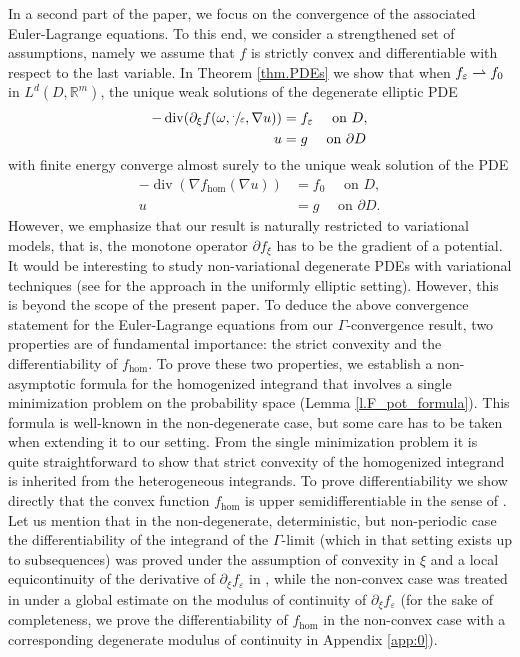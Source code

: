 \documentclass[JEP,XML,SOM,Unicode,published]{cedram}
\def\harptod{\mathrel{\relbar\joinrel\rightharpoonup}}
\def\harpto{\mathchoice{\harptod}{\rightharpoonup}{\rightharpoonup}{\rightharpoonup}}
\DeclareMathOperator{\dive}{div}
\theoremstyle{definition}
\let\e\varepsilon
\let\w\omega
\newcommand{\R}{\mathbb{R}}
\begin{document}
In a second part of the paper, we focus on the convergence of the associated Euler-Lagrange equations. To this end, we consider a strengthened set of assumptions, namely we assume that $f$ is strictly convex and differentiable with respect to the last variable. In Theorem \ref{thm.PDEs} we show that when $f_{\e}\harpto f_0$ in $L^d(D,\R^m)$, the unique weak solutions of the degenerate elliptic PDE
\begin{align*}
-\dive(\partial_{\xi }f(\w,\sfrac{\cdot}{\e},\nabla u))&=f_{\e}\quad\text{ on }D,
\\
u&=g\quad\text{ on }\partial D
\end{align*}
with finite energy converge almost surely to the unique weak solution of the PDE
\begin{align*}
-\dive(\nabla f_{\hom}(\nabla u))&=f_0\quad\text{ on }D,
\\
u&=g\quad\text{ on }\partial D.
\end{align*}
However, we emphasize that our result is naturally restricted to variational models, that is, the monotone operator $\partial f_{\xi}$ has to be the gradient of a potential. It would be interesting to study non-variational degenerate PDEs with variational techniques (see \cite{ArMo} for the approach in the uniformly elliptic setting). However, this is beyond the scope of the present paper. To deduce the above convergence statement for the Euler-Lagrange equations from our $\Gamma$-convergence result, two properties are of fundamental importance: the strict convexity and the differentiability of $f_{\hom}$. To prove these two properties, we establish a non-asymptotic formula for the homogenized integrand that involves a single minimization problem on the probability space (\cf Lemma \ref{l.F_pot_formula}). This formula is well-known in the non-degenerate case, but some care has to be taken when extending it to our setting. From the single minimization problem it is quite straightforward to show that strict convexity of the homogenized integrand is inherited from the heterogeneous integrands. To prove differentiability we show directly that the convex function $f_{\hom}$ is upper semidifferentiable in the sense of \cite{BKK}. Let us mention that in the non-degenerate, deterministic, but non-periodic case the differentiability of the integrand of the $\Gamma$-limit (which in that setting exists up to subsequences) was proved under the assumption of convexity in $\xi$ and a local equicontinuity of the derivative of $\partial_{\xi}f_{\e}$ in \cite[Prop.\,3.5]{GiPo}, while the non-convex case was treated in \cite[Th.\,2.8]{ADMZ} under a global estimate on the modulus of continuity of $\partial_{\xi}f_{\e}$ (for the sake of completeness, we prove the differentiability of $f_{\hom}$ in the non-convex case with a corresponding degenerate modulus of continuity in Appendix \ref{app:0}).
\end{document}

